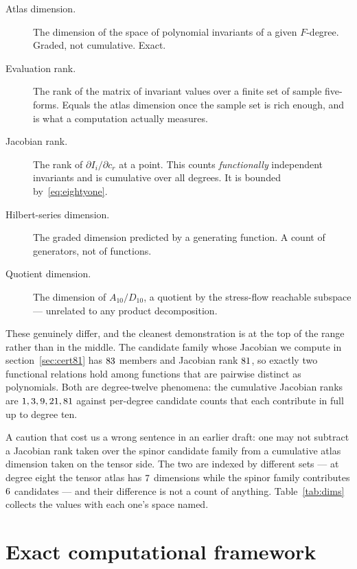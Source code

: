 \documentclass[11pt,a4paper]{article}
\begin{document}
\begin{description}
\item[Atlas dimension.] The dimension of the space of polynomial invariants of a
  given $F$-degree. Graded, not cumulative. Exact.
\item[Evaluation rank.] The rank of the matrix of invariant values over a finite
  set of sample five-forms. Equals the atlas dimension once the sample set is
  rich enough, and is what a computation actually measures.
\item[Jacobian rank.] The rank of $\partial I_i/\partial c_r$ at a point. This
  counts \emph{functionally} independent invariants and is cumulative over all
  degrees. It is bounded by~\eqref{eq:eightyone}.
\item[Hilbert-series dimension.] The graded dimension predicted by a generating
  function. A count of generators, not of functions.
\item[Quotient dimension.] The dimension of $A_{10}/D_{10}$, a quotient by the
  stress-flow reachable subspace --- unrelated to any product decomposition.
\end{description}

These genuinely differ, and the cleanest demonstration is at the top of the
range rather than in the middle. The candidate family whose Jacobian we compute
in section~\ref{sec:cert81} has $83$ members and Jacobian rank
$81$, so exactly two functional relations hold among functions that
are pairwise distinct as polynomials. Both are degree-twelve phenomena: the
cumulative Jacobian ranks are $1, 3,
9, 21, 81$ against per-degree candidate
counts that each contribute in full up to degree ten.

A caution that cost us a wrong sentence in an earlier draft: one may not subtract
a Jacobian rank taken over the spinor candidate family from a cumulative atlas
dimension taken on the tensor side. The two are indexed by different sets --- at
degree eight the tensor atlas has $7$ dimensions while the
spinor family contributes $6$ candidates --- and their
difference is not a count of anything. Table~\ref{tab:dims} collects the values
with each one's space named.



\section{Exact computational framework}
\label{sec:framework}
\end{document}
